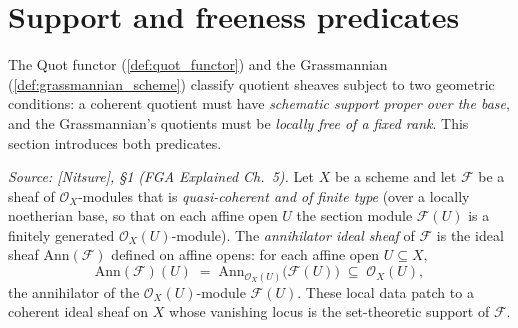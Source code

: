 \section{Support and freeness predicates}
\label{sec:quot_predicates}

The Quot functor (\cref{def:quot_functor}) and the Grassmannian
(\cref{def:grassmannian_scheme}) classify quotient sheaves subject to two
geometric conditions: a coherent quotient must have \emph{schematic support
proper over the base}, and the Grassmannian's quotients must be \emph{locally
free of a fixed rank}. This section introduces both predicates.

\begin{definition}

  \label{def:modules_annihilator}
  \textit{Source: [Nitsure], \S 1 (FGA Explained Ch.~5).}
  Let \(X\) be a scheme and let \(\mathcal{F}\) be a sheaf of
  \(\mathcal{O}_X\)-modules that is \emph{quasi-coherent and of finite type}
  (over a locally noetherian base, so that on each affine open \(U\) the section
  module \(\mathcal{F}(U)\) is a finitely generated \(\mathcal{O}_X(U)\)-module).
  The \emph{annihilator ideal sheaf} of \(\mathcal{F}\) is the ideal sheaf
  \(\mathrm{Ann}(\mathcal{F})\) defined on affine opens: for each affine open
  \(U \subseteq X\),
  \[
    \mathrm{Ann}(\mathcal{F})(U)
    \;=\; \mathrm{Ann}_{\mathcal{O}_X(U)}\bigl(\mathcal{F}(U)\bigr)
    \;\subseteq\; \mathcal{O}_X(U),
  \]
  the annihilator of the \(\mathcal{O}_X(U)\)-module \(\mathcal{F}(U)\). These
  local data patch to a coherent ideal sheaf on \(X\) whose vanishing locus is
  the set-theoretic support of \(\mathcal{F}\).


\end{definition}
